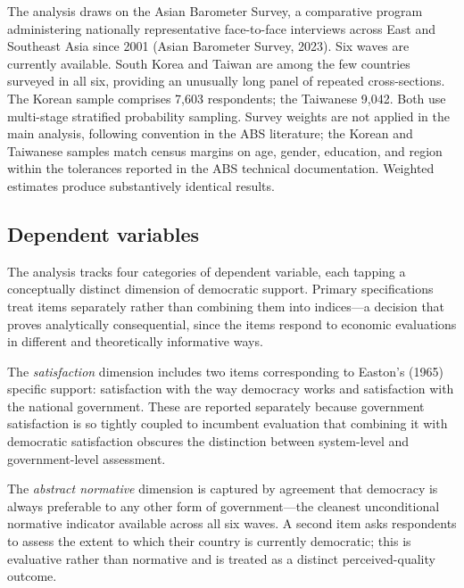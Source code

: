 \documentclass[
  12pt,
  12pt,
  letterpaper]{article}
\begin{document}
The analysis draws on the Asian Barometer Survey, a comparative program
administering nationally representative face-to-face interviews across
East and Southeast Asia since 2001 (Asian Barometer Survey, 2023). Six
waves are currently available. South Korea and Taiwan are among the few
countries surveyed in all six, providing an unusually long panel of
repeated cross-sections. The Korean sample comprises 7,603 respondents;
the Taiwanese 9,042. Both use multi-stage stratified probability
sampling. Survey weights are not applied in the main analysis, following
convention in the ABS literature; the Korean and Taiwanese samples match
census margins on age, gender, education, and region within the
tolerances reported in the ABS technical documentation. Weighted
estimates produce substantively identical results.

\subsection{Dependent variables}\label{dependent-variables}

The analysis tracks four categories of dependent variable, each tapping
a conceptually distinct dimension of democratic support. Primary
specifications treat items separately rather than combining them into
indices---a decision that proves analytically consequential, since the
items respond to economic evaluations in different and theoretically
informative ways.

The \emph{satisfaction} dimension includes two items corresponding to
Easton's (1965) specific support: satisfaction with the way democracy
works and satisfaction with the national government. These are reported
separately because government satisfaction is so tightly coupled to
incumbent evaluation that combining it with democratic satisfaction
obscures the distinction between system-level and government-level
assessment.

The \emph{abstract normative} dimension is captured by agreement that
democracy is always preferable to any other form of government---the
cleanest unconditional normative indicator available across all six
waves. A second item asks respondents to assess the extent to which
their country is currently democratic; this is evaluative rather than
normative and is treated as a distinct perceived-quality outcome.
\end{document}

